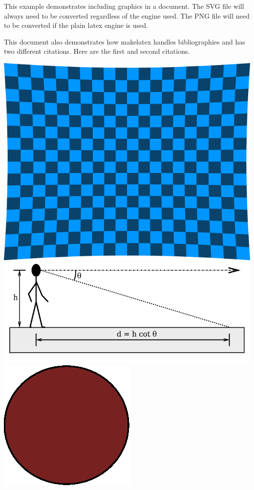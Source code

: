 \documentclass[letterpaper,12pt]{article}
\begin{document}
This example demonstrates including graphics in a document. The SVG file will always need to be converted regardless of the engine used. The PNG file will need to be converted if the plain latex engine is used.

This document also demonstrates how makelatex handles bibliographies and has two different citations. Here are the first \cite{chicago} and second \cite{latexbook} citations.


\includegraphics[width=.5\textwidth]{checkerboard}
\includegraphics[width=\textwidth]{subdir/angle-of-decl}
\includegraphics[width=.1\textwidth]{red-circle}



\end{document}
